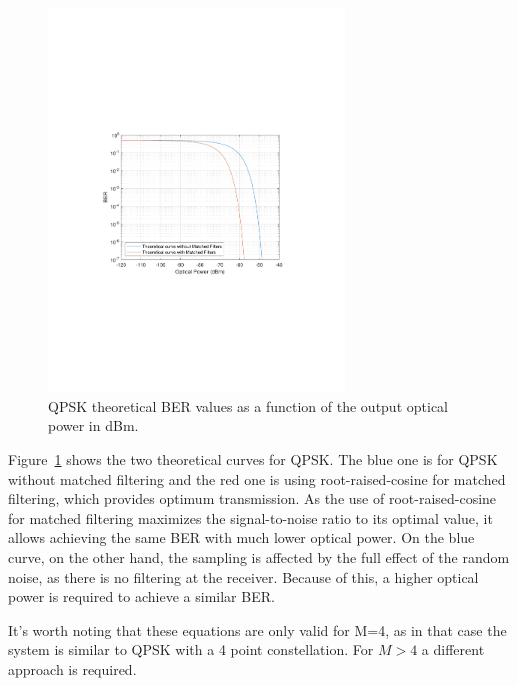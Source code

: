 \begin{figure}
\begin{minipage}[b]{0.4\linewidth}
\begin{table}[H]
\begin{tabular}{|l|l|}
	\end{tabular}
\end{table}
\end{minipage}
\begin{minipage}[b]{0.6\linewidth}
		\centering
		\includegraphics[clip, trim=4cm 8cm 4cm 8cm, width=0.7\textwidth]{./sdf/m_qam_system/figures/teor_BER_curves.pdf}
%			
\end{minipage}
\caption{QPSK theoretical BER values as a function of the output optical power in dBm.\label{fig:QPSK_th_curves}}
\end{figure}


Figure~\ref{fig:QPSK_th_curves} shows the two theoretical curves for QPSK. The blue one is for QPSK without matched filtering and the red one is using root-raised-cosine for matched filtering, which provides optimum transmission. As the use of root-raised-cosine for matched filtering maximizes the signal-to-noise ratio to its optimal value, it allows achieving the same BER with much lower optical power. On the blue curve, on the other hand, the sampling is affected by the full effect of the random noise, as there is no filtering at the receiver. Because of this, a higher optical power is required to achieve a similar BER.


It's worth noting that these equations are only valid for M=4, as in that case the system is similar to QPSK with a 4 point constellation. For $M > 4$ a different approach is required.

